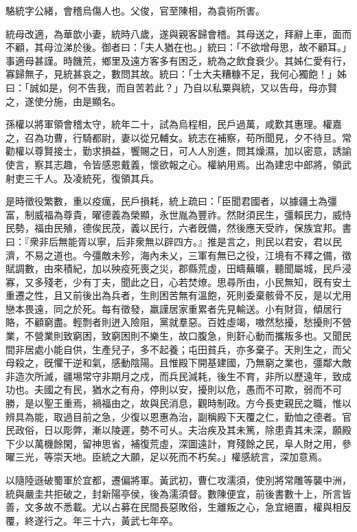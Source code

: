 \begin{pinyinscope}
 
 
 駱統字公緒，會稽烏傷人也。父俊，官至陳相，為袁術所害。
 
 
 統母改適，為華歆小妻，統時八歲，遂與親客歸會稽。其母送之，拜辭上車，面而不顧，其母泣涕於後。御者曰：「夫人猶在也。」統曰：「不欲增母思，故不顧耳。」事適母甚謹。時饑荒，鄉里及遠方客多有困乏，統為之飲食衰少。其姊仁愛有行，寡歸無子，見統甚哀之，數問其故。統曰：「士大夫糟糠不足，我何心獨飽！」姊曰：「誠如是，何不告我，而自苦若此？」乃自以私粟與統，又以告母，母亦賢之，遂使分施，由是顯名。
 
 
 
 
 孫權以將軍領會稽太守，統年二十，試為烏程相，民戶過萬，咸歎其惠理。權嘉之，召為功曹，行騎都尉，妻以從兄輔女。統志在補察，苟所聞見，夕不待旦。常勸權以尊賢接士，勤求損益，饗賜之日，可人人別進，問其燥濕，加以密意，誘諭使言，察其志趣，令皆感恩戴義，懷欲報之心。權納用焉。出為建忠中郎將，領武射吏三千人。及凌統死，復領其兵。
 
 
 
 
 是時徵役繁數，重以疫癘，民戶損耗，統上疏曰：「臣聞君國者，以據疆土為彊富，制威福為尊貴，曜德義為榮顯，永世胤為豐祚。然財須民生，彊賴民力，威恃民勢，福由民殖，德俟民茂，義以民行，六者旣備，然後應天受祚，保族宜邦。書曰：『衆非后無能胥以寧，后非衆無以辟四方。』推是言之，則民以君安，君以民濟，不易之道也。今彊敵未殄，海內未乂，三軍有無已之役，江境有不釋之備，徵賦調數，由來積紀，加以殃疫死喪之災，郡縣荒虛，田疇蕪曠，聽聞屬城，民戶浸寡，又多殘老，少有丁夫，聞此之日，心若焚燎。思尋所由，小民無知，旣有安土重遷之性，且又前後出為兵者，生則困苦無有溫飽，死則委棄骸骨不反，是以尤用戀本畏遠，同之於死。每有徵發，羸謹居家重累者先見輸送。小有財貨，傾居行賂，不顧窮盡。輕剽者則迸入險阻，黨就羣惡。百姓虛竭，嗷然愁擾，愁擾則不營業，不營業則致窮困，致窮困則不樂生，故口腹急，則姧心動而攜叛多也。又聞民間非居處小能自供，生產兒子，多不起養；屯田貧兵，亦多棄子。天則生之，而父母殺之，旣懼干逆和氣，感動陰陽。且惟殿下開基建國，乃無窮之業也，彊鄰大敵非造次所滅，疆埸常守非期月之戍，而兵民減耗，後生不育，非所以歷遠年，致成功也。夫國之有民，猶水之有舟，停則以安，擾則以危，愚而不可欺，弱而不可勝，是以聖王重焉，禍福由之，故與民消息，觀時制政。方今長吏親民之職，惟以辨具為能，取過目前之急，少復以恩惠為治，副稱殿下天覆之仁，勤恤之德者。官民政俗，日以彫弊，漸以陵遲，勢不可乆。夫治疾及其未篤，除患貴其未深，願殿下少以萬機餘閑，留神思省，補復荒虛，深圖遠計，育殘餘之民，阜人財之用，參曜三光，等崇天地。臣統之大願，足以死而不朽矣。」權感統言，深加意焉。
 
 
 
 
 以隨陸遜破蜀軍於宜都，遷偏將軍。黃武初，曹仁攻濡須，使別將常雕等襲中洲，統與嚴圭共拒破之，封新陽亭侯，後為濡須督。數陳便宜，前後書數十上，所言皆善，文多故不悉載。尤以占募在民間長惡敗俗，生離叛之心，急宜絕置，權與相反覆，終遂行之。年三十六，黃武七年卒。
 
 
\end{pinyinscope}